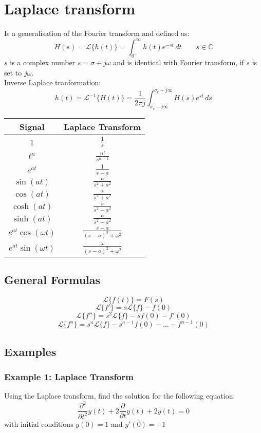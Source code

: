 \section{Laplace transform}
Is a generalisation of the Fourier transform and defined as:
$$H(s)=\mathcal{L}\{h(t)\}=\int_{0^-}^{\infty}h(t)e^{ -st }  \, dt \quad\quad s \in\mathbb{C}$$
$s$ is a complex number $s=\sigma+j\omega$ and is identical with Fourier transform, if $s$ is set to $j\omega$.\\
Inverse Laplace tranformation:
$$h(t)=\mathcal{L}^{-1}\{H(t)\}=\frac{1}{2\pi j}\int_{\sigma_{c}-j\infty}^{\sigma_{c}+j\infty} H(s)e^{ st } \, ds $$
\begin{table}[h]
\centering
\begin{tabular}{|c|c|}
\hline
\cellcolor[HTML]{C0C0C0} \textbf{Signal}& \cellcolor[HTML]{C0C0C0}\textbf{Laplace Transform}  \\ \hline
1&$\frac{1}{s}$ \\ \hline
$t^n$&$\frac{n!}{s^{n+1}}$ \\ \hline
$e^{at}$& $\frac{1}{s-a}$ \\ \hline
$\sin(at)$&$\frac{a}{s^2+a^2}$ \\ \hline
$\cos(at)$&$\frac{s}{s^2+a^2}$ \\ \hline
$\cosh(at)$&$\frac{s}{s^2-a^2}$ \\ \hline
$\sinh(at)$&$\frac{a}{s^2-a^2}$ \\ \hline
$e^{at}\cos(\omega t)$&$\frac{s-a}{(s-a)^2+\omega^2}$ \\ \hline
$e^{at}\sin(\omega t)$&$\frac{\omega}{(s-a)^2+\omega^2}$ \\ \hline
\end{tabular}
\end{table}

\subsection{General Formulas}
$$\mathcal{L}\{f(t)\}=F(s)$$
$$\mathcal{L}\{f'\}=s\mathcal{L}\{f\}-f(0)$$
$$\mathcal{L}\{f''\}=s^2\mathcal{L}\{f\}-sf(0)-f'(0)$$
$$\mathcal{L}\{f^n\}=s^n\mathcal{L}\{f\}-s^{n-1}f(0)-\dots -f^{n-1}(0)$$
\subsection{Examples}
\subsubsection{Example 1: Laplace Transform}
Using the Laplace transform, find the solution for the following equation:
$$\frac{\partial^{2}}{\partial t^{2}}y(t)+2\frac{\partial}{\partial t}y(t)+2y(t)=0$$
with initial conditions $y (0) = 1$ and $y' (0) = -1$


